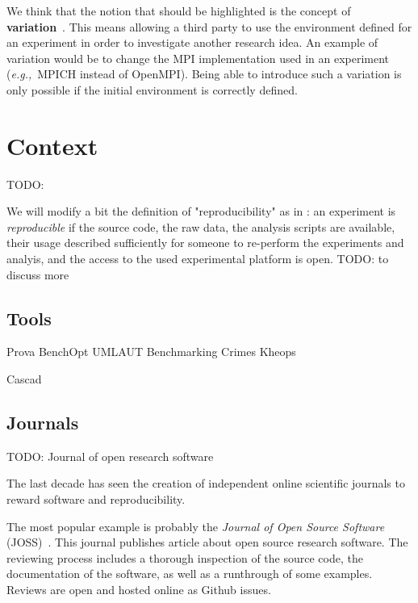\documentclass[sigconf,natbib=false]{acmart}
\newcommand{\repro}{reproducibility}
\newcommand{\eg}{\emph{e.g.,}}
\newcommand{\todo}[1]{{\color{red}TODO: #1}}
\begin{document}
We think that the notion that should be highlighted is the concept of \textbf{variation}\ \cite{mercier2018considering, feitelson_repeatability_2015}.
This means allowing a third party to use the environment defined for an experiment in order to investigate another research idea.
An example of variation would be to change the MPI implementation used in an experiment (\eg\ MPICH instead of OpenMPI).
Being able to introduce such a variation is only possible if the initial environment is correctly defined.

%
\section{Context}

\todo{}

We will modify a bit the definition of "\repro" as in \cite{rougier2019rescience}:
an experiment is \emph{reproducible} if the source code, the raw data, the analysis scripts are available, their usage described sufficiently for someone to re-perform the experiments and analyis, and the access to the used experimental platform is open.
\todo{to discuss more}


\subsection{Tools}

Prova \cite{guerrera2019reproducible}
BenchOpt \cite{moreau2022benchopt}
UMLAUT \cite{umlaut}
Benchmarking Crimes \cite{van2018benchmarking}
Kheops \cite{rosendo2023kheops}

Cascad \cite{perignon2019certify}

\subsection{Journals}


\todo{Journal of open research software \cite{hong2013software}}

The last decade has seen the creation of independent online scientific journals to reward software and reproducibility.

The most popular example is probably the \emph{Journal of Open Source Software} (JOSS)\ \cite{smith2018journal}.
This journal publishes article about open source research software.
The reviewing process includes a thorough inspection of the source code, the documentation of the software, as well as a runthrough of some examples.
Reviews are open and hosted online as Github issues.
\end{document}
